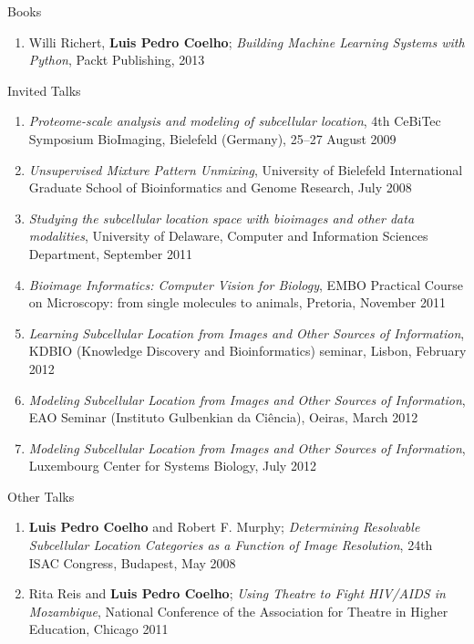 \documentclass{article}
\renewcommand\subsection[1]{%
    \par\vspace{.1em}%
    {\hspace{1em}\subsubhead #1}%
    \par\vspace{.2em}%
}
\begin{document}
\subsection{Books}
\begin{enumerate}
\item Willi Richert, \textbf{Luis Pedro Coelho}; \emph{Building Machine
Learning Systems with Python}, Packt Publishing, 2013
\end{enumerate}

\subsection{Invited Talks}
\begin{enumerate}
\item \emph{Proteome-scale analysis and modeling of subcellular location}, 4th
CeBiTec Symposium BioImaging, Bielefeld (Germany), 25--27 August 2009
\item \emph{Unsupervised Mixture Pattern Unmixing}, University of Bielefeld
International Graduate School of Bioinformatics and Genome Research, July 2008
\item \emph{Studying the subcellular location space with bioimages and other
data modalities}, University of Delaware, Computer and Information Sciences
Department, September 2011
\item \emph{Bioimage Informatics: Computer Vision for Biology}, EMBO Practical
Course on Microscopy: from single molecules to animals, Pretoria, November 2011
\item \emph{Learning Subcellular Location from Images and Other Sources of
Information}, KDBIO (Knowledge Discovery and Bioinformatics) seminar, Lisbon,
February 2012
\item \emph{Modeling Subcellular Location from Images and Other Sources of
Information}, EAO Seminar (Instituto Gulbenkian da Ciência), Oeiras, March 2012
\item \emph{Modeling Subcellular Location from Images and Other Sources of
Information}, Luxembourg Center for Systems Biology, July 2012

\end{enumerate}


\subsection{Other Talks}

\begin{enumerate}
\item \textbf{Luis Pedro Coelho} and Robert F. Murphy; \emph{Determining
Resolvable Subcellular Location Categories as a Function of Image Resolution},
24th ISAC Congress, Budapest, May 2008
\item Rita Reis and \textbf{Luis Pedro Coelho}; \emph{Using Theatre to Fight
HIV/AIDS in Mozambique}, National Conference of the Association for Theatre in
Higher Education, Chicago 2011
\end{enumerate}
\end{document}
